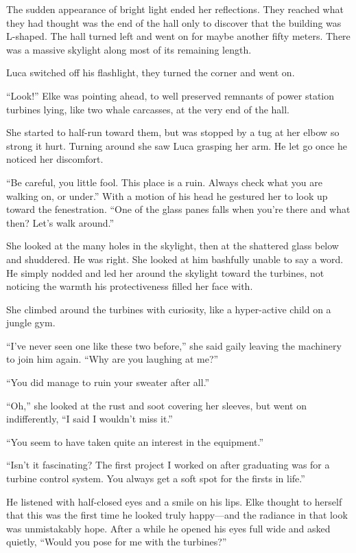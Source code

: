 The sudden appearance of bright light ended her reflections. They reached what they had thought was the end of the hall only to discover that the building was L-shaped. The hall turned left and went on for maybe another fifty meters. There was a massive skylight along most of its remaining length.

Luca switched off his flashlight, they turned the corner and went on.

``Look!'' Elke was pointing ahead, to well preserved remnants of power station turbines lying, like two whale carcasses, at the very end of the hall.

She started to half-run toward them, but was stopped by a tug at her elbow so strong it hurt. Turning around she saw Luca grasping her arm. He let go once he noticed her discomfort.

``Be careful, you little fool. This place is a ruin. Always check what you are walking on, or under.'' With a motion of his head he gestured her to look up toward the fenestration. ``One of the glass panes falls when you're there and what then? Let's walk around.''

She looked at the many holes in the skylight, then at the shattered glass below and shuddered. He was right. She looked at him bashfully unable to say a word. He simply nodded and led her around the skylight toward the turbines, not noticing the warmth his protectiveness filled her face with.

She climbed around the turbines with curiosity, like a hyper-active child on a jungle gym.

``I've never seen one like these two before,'' she said gaily leaving the machinery to join him again. ``Why are you laughing at me?''

``You did manage to ruin your sweater after all.''

``Oh,'' she looked at the rust and soot covering her sleeves, but went on indifferently, ``I said I wouldn't miss it.''

``You seem to have taken quite an interest in the equipment.''

``Isn't it fascinating? The first project I worked on after graduating was for a turbine control system. You always get a soft spot for the firsts in life.''

He listened with half-closed eyes and a smile on his lips. Elke thought to herself that this was the first time he looked truly happy---and the radiance in that look was unmistakably hope. After a while he opened his eyes full wide and asked quietly, ``Would you pose for me with the turbines?''

